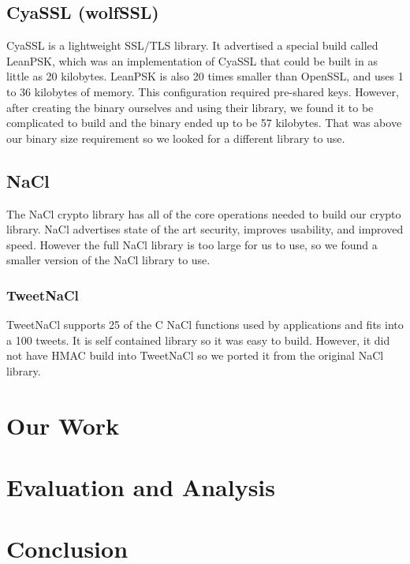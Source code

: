 \documentclass[12pt]{article}
\begin{document}
\begin{multicols}{2}
\subsection{CyaSSL (wolfSSL)}
CyaSSL is a lightweight SSL/TLS library. It advertised a special build called LeanPSK, which was an implementation of CyaSSL that could be built in as little as 20 kilobytes. LeanPSK is also 20 times smaller than OpenSSL, and uses 1 to 36 kilobytes of memory. This configuration required pre-shared keys. However, after creating the binary ourselves and using their library, we found it to be complicated to build and the binary ended up to be 57 kilobytes. That was above our binary size requirement so we looked for a different library to use. 
\subsection{NaCl}
The NaCl crypto library has all of the core operations needed to build our crypto library. NaCl advertises state of the art security, improves usability, and improved speed. However the full NaCl library is too large for us to use, so we found a smaller version of the NaCl library to use.
\subsubsection{TweetNaCl}
TweetNaCl supports 25 of the C NaCl functions used by applications and fits into a 100 tweets. It is self contained library so it was easy to build. However, it did not have HMAC build into TweetNaCl so we ported it from the original NaCl library.
\section{Our Work}
\section{Evaluation and Analysis}
\section{Conclusion}
\end{multicols}
\end{document}
